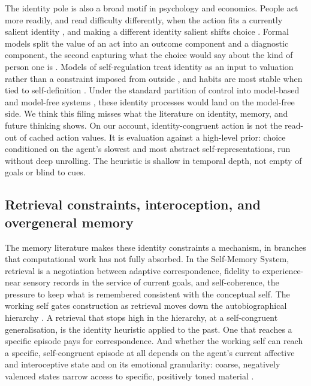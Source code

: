 \documentclass[11pt,a4paper]{article}
\begin{document}
The identity pole is also a broad motif in psychology and economics. People act more readily, and read difficulty differently, when the action fits a currently salient identity \citep{oyserman2009}, and making a different identity salient shifts choice \citep{leboeufetal2010}. Formal models split the value of an act into an outcome component and a diagnostic component, the second capturing what the choice would say about the kind of person one is \citep{akerlofkranton2000, bodnerprelec2003}. Models of self-regulation treat identity as an input to valuation rather than a constraint imposed from outside \citep{berkmanetal2017}, and habits are most stable when tied to self-definition \citep{verplankensui2019}. Under the standard partition of control into model-based and model-free systems \citep{dawetal2005, dolandayan2013}, these identity processes would land on the model-free side. We think this filing misses what the literature on identity, memory, and future thinking shows. On our account, identity-congruent action is not the read-out of cached action values. It is evaluation against a high-level prior: choice conditioned on the agent's slowest and most abstract self-representations, run without deep unrolling. The heuristic is shallow in temporal depth, not empty of goals or blind to cues.

\subsection{Retrieval constraints, interoception, and overgeneral memory}\label{sec:retrieval_constraints}
The memory literature makes these identity constraints a mechanism, in branches that computational work has not fully absorbed. In the Self-Memory System, retrieval is a negotiation between adaptive correspondence, fidelity to experience-near sensory records in the service of current goals, and self-coherence, the pressure to keep what is remembered consistent with the conceptual self. The working self gates construction as retrieval moves down the autobiographical hierarchy \citep{conwaypleydellpearce2000, conwaysingertagini2004, conway2005}. A retrieval that stops high in the hierarchy, at a self-congruent generalisation, is the identity heuristic applied to the past. One that reaches a specific episode pays for correspondence. And whether the working self can reach a specific, self-congruent episode at all depends on the agent's current affective and interoceptive state and on its emotional granularity: coarse, negatively valenced states narrow access to specific, positively toned material \citep{bower1981, forgas1995, sethfriston2016, pezzulorigolifriston2015}.
\end{document}
